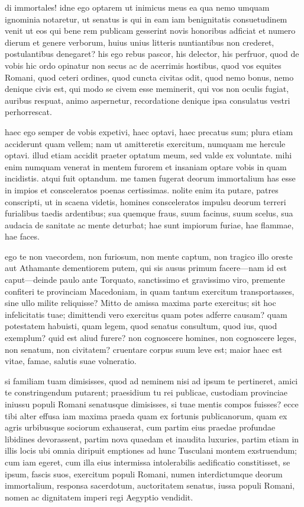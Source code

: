  di immortales! idne ego optarem ut inimicus meus ea qua nemo umquam ignominia notaretur, ut senatus is qui in eam iam benignitatis consuetudinem venit ut eos qui bene rem publicam gesserint novis honoribus adficiat et numero dierum et genere verborum, huius unius litteris nuntiantibus non crederet, postulantibus denegaret? his ego rebus pascor, his delector, his perfruor, quod de vobis hic ordo opinatur non secus ac de acerrimis hostibus, quod vos equites Romani, quod ceteri ordines, quod cuncta civitas odit, quod nemo bonus, nemo denique civis est, qui modo se civem esse meminerit, qui vos non oculis fugiat, auribus respuat, animo aspernetur, recordatione denique ipsa consulatus vestri perhorrescat.

 haec ego semper de vobis expetivi, haec optavi, haec precatus sum; plura etiam acciderunt quam vellem; nam ut amitteretis exercitum, numquam me hercule optavi. illud etiam accidit praeter optatum meum, sed valde ex voluntate. mihi enim numquam venerat in mentem furorem et insaniam optare vobis in quam incidistis. atqui fuit optandum. me tamen fugerat deorum immortalium has esse in impios et consceleratos poenas certissimas. nolite enim ita putare, patres conscripti, ut in scaena videtis, homines consceleratos impulsu deorum terreri furialibus taedis ardentibus; sua quemque fraus, suum facinus, suum scelus, sua audacia de sanitate ac mente deturbat; hae sunt impiorum furiae, hae flammae, hae faces.

 ego te non vaecordem, non furiosum, non mente captum, non tragico illo oreste aut Athamante dementiorem putem, qui sis ausus primum facere—nam id est caput—deinde paulo ante Torquato, sanctissimo et gravissimo viro, premente confiteri te provinciam Macedoniam, in quam tantum exercitum transportasses, sine ullo milite reliquisse? Mitto de amissa maxima parte exercitus; sit hoc infelicitatis tuae; dimittendi vero exercitus quam potes adferre causam? quam potestatem habuisti, quam legem, quod senatus consultum, quod ius, quod exemplum? quid est aliud furere? non cognoscere homines, non cognoscere leges, non senatum, non civitatem? cruentare corpus suum leve est; maior haec est vitae, famae, salutis suae volneratio.

 si familiam tuam dimisisses, quod ad neminem nisi ad ipsum te pertineret, amici te constringendum putarent; praesidium tu rei publicae, custodiam provinciae iniussu populi Romani senatusque dimisisses, si tuae mentis compos fuisses? ecce tibi alter effusa iam maxima praeda quam ex fortunis publicanorum, quam ex agris urbibusque sociorum exhauserat, cum partim eius praedae profundae libidines devorassent, partim nova quaedam et inaudita luxuries, partim etiam in illis locis ubi omnia diripuit emptiones ad hunc Tusculani montem exstruendum; cum iam egeret, cum illa eius intermissa intolerabilis aedificatio constitisset, se ipsum, fascis suos, exercitum populi Romani, numen interdictumque deorum immortalium, responsa sacerdotum, auctoritatem senatus, iussa populi Romani, nomen ac dignitatem imperi regi Aegyptio vendidit.

